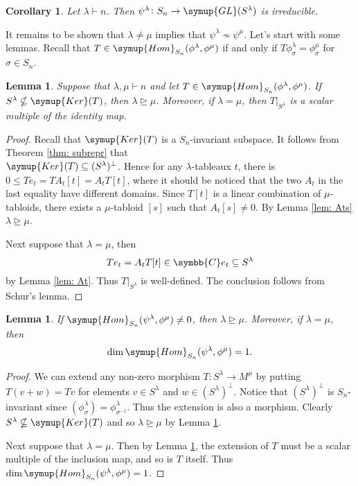 \documentclass{assignment}[2019/10/15]
\theoremstyle{plain}
\newtheorem{lemma}[theorem]{Lemma}
\newtheorem{corollary}[theorem]{Corollary}
\newcommand{\BC}{\symbb{C}}
\newcommand{\Kernal}{\mathop{}\!\symup{Ker}}
\newcommand{\Hom}{\mathop{}\!\symup{Hom}}
\newcommand{\GL}{\mathop{}\!\symup{GL}}
\begin{document}
    \begin{corollary}
        Let $\lambda\vdash n$. Then $\psi^\lambda\colon S_n\to \GL(S^\lambda)$ is irreducible.
    \end{corollary}

    It remains to be shown that $\lambda\neq\mu$ implies that $\psi^\lambda\nsim\psi^\mu$. Let's start with some lemmas. Recall that $T\in \Hom_{S_n}(\phi^\lambda, \phi^\mu)$ if and only if $T\phi^\lambda_\sigma = \phi^\mu_\sigma$ for $\sigma\in S_n$.

    \begin{lemma}\label{lem: T-hom}
        Suppose that $\lambda, \mu\vdash n$ and let $T\in \Hom_{S_n}(\phi^\lambda, \phi^\mu)$. If $S^\lambda\nsubseteq \Kernal(T)$, then $\lambda\unrhd \mu$. Moreover, if $\lambda=\mu$, then $T|_{S^\lambda}$ is a scalar multiple of the identity map.
    \end{lemma}

    \begin{proof}
        Recall that $\Kernal(T)$ is a $S_n$-invariant subspace. It follows from Theorem \ref{thm: subrepr} that\\ $\Kernal(T)\subseteq(S^\lambda)^\perp$. Hence for any $\lambda$-tableaux $t$, there is $0\leq Te_t = TA_t[t]=A_tT[t]$, where it should be noticed that the two $A_t$ in the last equality have different domains. Since $T[t]$ is a linear combination of $\mu$-tabloids, there exists a $\mu$-tabloid $[s]$ such that $A_t[s]\neq 0$. By Lemma \ref{lem: Ats} $\lambda\unrhd\mu$.

        Next suppose that $\lambda=\mu$, then
        \begin{equation}
            Te_t = A_tT[t]\in \BC e_t \subseteq S^\lambda
        \end{equation}
        by Lemma \ref{lem: At}. Thus $T|_{S^\lambda}$ is well-defined. The conclusion follows from Schur's lemma.
    \end{proof}

    \begin{lemma}\label{lem: hom-ker}
        If $\Hom_{S_n}(\psi^\lambda, \phi^\mu)\neq 0$, then $\lambda\unrhd \mu$. Moreover, if $\lambda=\mu$, then
        \begin{equation}
            \dim\Hom_{S_n}(\psi^\lambda, \phi^\mu)=1.
        \end{equation}
    \end{lemma}

    \begin{proof}
        We can extend any non-zero morphism $T\colon S^\lambda\to M^\mu$ by putting $T(v+w)=Tv$ for elements $v\in S^\lambda$ and $w\in (S^\lambda)^\perp$. Notice that $(S^\lambda)^\perp$ is $S_n$-invariant since $(\phi_\sigma^\lambda)=\phi_{\sigma^{-1}}^\lambda$. Thus the extension is also a morphism. Clearly $S^\lambda\nsubseteq\Kernal(T)$ and so $\lambda\unrhd\mu$ by Lemma \ref{lem: T-hom}.

        Next suppose that $\lambda=\mu$. Then by Lemma \ref{lem: T-hom}, the extension of $T$ must be a scalar multiple of the inclusion map, and so is $T$ itself. Thus $\dim\Hom_{S_n}(\psi^\lambda, \phi^\mu)=1$.
    \end{proof}
\end{document}
